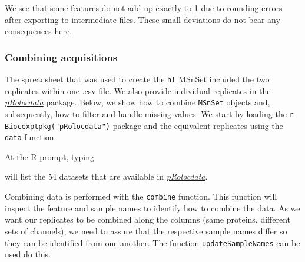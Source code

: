 We see that some features do not add up exactly to 1 due to rounding
errors after exporting to intermediate files. These small deviations do
not bear any consequences here.

\subsubsection{Combining acquisitions}\label{combining-acquisitions}

The spreadsheet that was used to create the \texttt{hl} MSnSet included
the two replicates within one .csv file. We also provide individual
replicates in the
\emph{\href{http://bioconductor.org/packages/pRolocdata}{pRolocdata}}
package. Below, we show how to combine \texttt{MSnSet} objects and,
subsequently, how to filter and handle missing values. We start by
loading the \texttt{r Biocexptpkg("pRolocdata")} package and the
equivalent replicates using the \texttt{data} function.

\begin{Shaded}
\begin{Highlighting}[]
\NormalTok{(}\NormalTok{)}
\end{Highlighting}
\end{Shaded}

At the R prompt, typing

\begin{Shaded}
\begin{Highlighting}[]
\NormalTok{()}
\end{Highlighting}
\end{Shaded}

will list the 54 datasets that are available in
\emph{\href{http://bioconductor.org/packages/pRolocdata}{pRolocdata}}.

Combining data is performed with the \texttt{combine} function. This
function will inspect the feature and sample names to identify how to
combine the data. As we want our replicates to be combined along the
columns (same proteins, different sets of channels), we need to assure
that the respective sample names differ so they can be identified from
one another. The function \texttt{updateSampleNames} can be used do
this.

\begin{Shaded}
\begin{Highlighting}[]
\NormalTok{(}
\end{Highlighting}
\end{Shaded}


